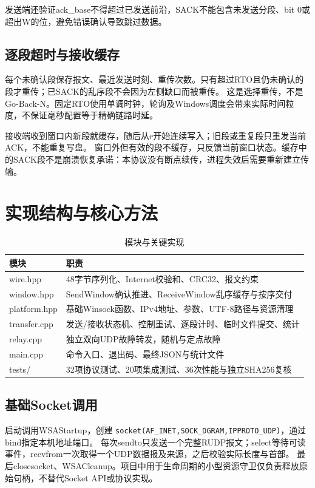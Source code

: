 \documentclass[UTF8,notitlepage,11pt]{ctexart}
\newcommand{\src}[1]{\nolinkurl{#1}}
\begin{document}
发送端还验证ack\_base不得超过已发送前沿，SACK不能包含未发送分段、bit 0或超出W的位，避免错误确认导致跳过数据。

\subsection{逐段超时与接收缓存}
每个未确认段保存报文、最近发送时刻、重传次数。只有超过RTO且仍未确认的段才重传；已SACK的乱序段不会因为左侧缺口而被重传。
这是选择重传，不是Go-Back-N。固定RTO使用单调时钟，轮询及Windows调度会带来实际时间粒度，不保证毫秒配置等于精确链路时延。

接收端收到窗口内新段就缓存，随后从$r$开始连续写入；旧段或重复段只重发当前ACK，不能重复写盘。
窗口外但有效的段不缓存，只反馈当前窗口状态。缓存中的SACK段不是崩溃恢复承诺：本协议没有断点续传，进程失效后需要重新建立传输。

\section{实现结构与核心方法}
\begin{table}[H]\centering\small
\caption{模块与关键实现}
\begin{tabularx}{\textwidth}{p{}X}\toprule
模块 & 职责\\\midrule
wire.hpp & 48字节序列化、Internet校验和、CRC32、报文约束\\
window.hpp & SendWindow确认推进、ReceiveWindow乱序缓存与按序交付\\
platform.hpp & 基础Winsock函数、IPv4地址、参数、UTF-8路径与资源清理\\
transfer.cpp & 发送/接收状态机、控制重试、逐段计时、临时文件提交、统计\\
relay.cpp & 独立双向UDP故障转发，随机与定点故障\\
main.cpp & 命令入口、退出码、最终JSON与统计文件\\
tests/ & 32项协议测试、20项集成测试、36次性能与独立SHA256复核\\\bottomrule
\end{tabularx}\end{table}

\subsection{基础Socket调用}
启动调用WSAStartup，创建 \src{socket(AF_INET,SOCK_DGRAM,IPPROTO_UDP)}，通过bind指定本机地址端口。
每次sendto只发送一个完整RUDP报文；select等待可读事件，recvfrom一次取得一个UDP数据报及来源，之后校验实际长度与首部。
最后closesocket、WSACleanup。项目中用于生命周期的小型资源守卫仅负责释放原始句柄，不替代Socket API或协议实现。
\end{document}

